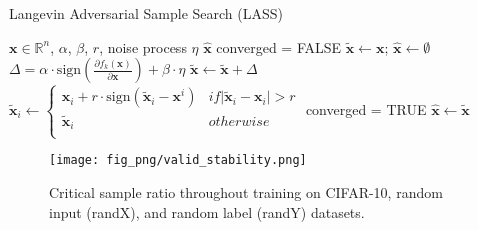 \documentclass{article}
\begin{document}
\begin{algorithm}[!ht]
	\caption{Langevin Adversarial Sample Search (LASS)}
	\begin{algorithmic}[1]
		\REQUIRE $\mathbf{x} \in \mathbb{R}^{n}$, $\alpha$, $\beta$, $ r $, noise process $ \eta $
		\ENSURE $\hat{\mathbf{x}}$
        \STATE converged = FALSE
		\STATE $ \tilde{\mathbf{x}} \leftarrow \mathbf{x} $; $ \hat{\mathbf{x}} \leftarrow \emptyset$
		\STATE $\Delta = \alpha \cdot \mbox{sign}(\frac{\partial f_{k}(\mathbf{x})}{\partial \mathbf{x}}) + \beta \cdot \eta$
		\STATE $ \tilde{\mathbf{x}}  \leftarrow \tilde{\mathbf{x}} + \Delta$
		\STATE  $ \tilde{\mathbf{x}}_{i}  \leftarrow \left\{ \begin{array}{ll}
		{\mathbf{x}}_{i} + r \cdot \mbox{sign}(\tilde{\mathbf{x}}_{i}- {\mathbf{x}}^{i}) & if \lvert \tilde{\mathbf{x}}_{i}- {\mathbf{x}}_{i} \rvert > r \\
		\tilde{\mathbf{x}}_{i} &  otherwise \\
		\end{array} 
		\right.$
		\ENDFOR
        \STATE converged = TRUE
        \STATE $\hat{\mathbf{x}} \leftarrow \tilde{\mathbf{x}}$
        \ENDIF
		\ENDWHILE
	\end{algorithmic}
    \label{algo_sens_search}
\end{algorithm}

\begin{figure}[!t]
	\center
	\label{fig_valid_stability}
	\texttt{[image: fig\_png/valid\_stability.png]}
	\caption{Critical sample ratio throughout training on CIFAR-10, random input (randX), and random label (randY) datasets.}
\end{figure}
\end{document}
